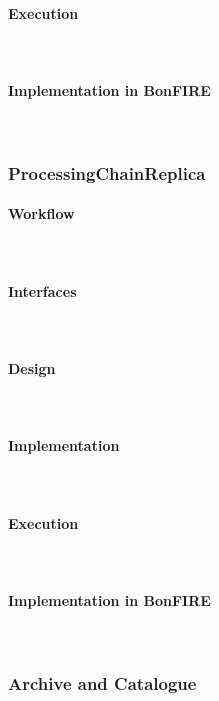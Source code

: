 \paragraph{Execution}~\\

\paragraph{Implementation in BonFIRE}~\\



\subsubsection{ProcessingChainReplica}

\paragraph{Workflow}~\\

\paragraph{Interfaces}~\\

\paragraph{Design}~\\


\paragraph{Implementation}~\\

\paragraph{Execution}~\\

\paragraph{Implementation in BonFIRE}~\\



\subsubsection{Archive and Catalogue}

